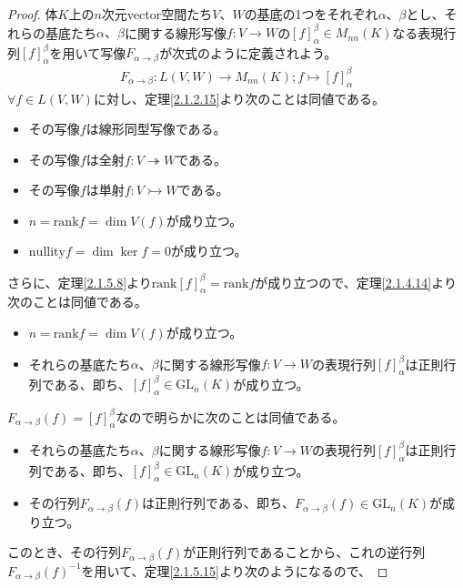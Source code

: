 \documentclass[dvipdfmx]{jsarticle}
\begin{document}
\begin{proof}
体$K$上の$n$次元vector空間たち$V$、$W$の基底の1つをそれぞれ$\alpha$、$\beta$とし、それらの基底たち$\alpha 、\beta$に関する線形写像$f:V \rightarrow W$の$[ f]^{\beta}_{\alpha} \in M_{nn}(K)$なる表現行列$[ f]^{\beta}_{\alpha}$を用いて写像$F_{\alpha \rightarrow \beta}$が次式のように定義されよう。
\begin{align*}
F_{\alpha \rightarrow \beta}:L(V,W) \rightarrow M_{nn}(K);f \mapsto [ f]^{\beta}_{\alpha}
\end{align*}
$\forall f \in L(V,W)$に対し、定理\ref{2.1.2.15}より次のことは同値である。
\begin{itemize}
\item
  その写像$f$は線形同型写像である。
\item
  その写像$f$は全射$f:V \twoheadrightarrow W$である。
\item
  その写像$f$は単射$f:V \rightarrowtail W$である。
\item
  $n = {\mathrm{rank}}f = \dim{V(f)}$が成り立つ。
\item
  ${\mathrm{nullity}}f = \dim{\ker f} = 0$が成り立つ。
\end{itemize}
さらに、定理\ref{2.1.5.8}より${\mathrm{rank}}[ f]^{\beta}_{\alpha} = {\mathrm{rank}}f$が成り立つので、定理\ref{2.1.4.14}より次のことは同値である。
\begin{itemize}
\item
  $n = {\mathrm{rank}}f = \dim{V(f)}$が成り立つ。
\item
  それらの基底たち$\alpha$、$\beta$に関する線形写像$f:V \rightarrow W$の表現行列$[ f]^{\beta}_{\alpha}$は正則行列である、即ち、$[ f]^{\beta}_{\alpha} \in {\mathrm{GL}}_{n}(K)$が成り立つ。
\end{itemize}
$F_{\alpha \rightarrow \beta}(f) = [ f]^{\beta}_{\alpha}$なので明らかに次のことは同値である。
\begin{itemize}
\item
  それらの基底たち$\alpha$、$\beta$に関する線形写像$f:V \rightarrow W$の表現行列$[ f]^{\beta}_{\alpha}$は正則行列である、即ち、$[ f]^{\beta}_{\alpha} \in {\mathrm{GL}}_{n}(K)$が成り立つ。
\item
  その行列$F_{\alpha \rightarrow \beta}(f)$は正則行列である、即ち、$F_{\alpha \rightarrow \beta}(f) \in {\mathrm{GL}}_{n}(K)$が成り立つ。
\end{itemize}\par
このとき、その行列$F_{\alpha \rightarrow \beta}(f)$が正則行列であることから、これの逆行列${F_{\alpha \rightarrow \beta}(f)}^{- 1}$を用いて、定理\ref{2.1.5.15}より次のようになるので、

\end{proof}
\end{document}
